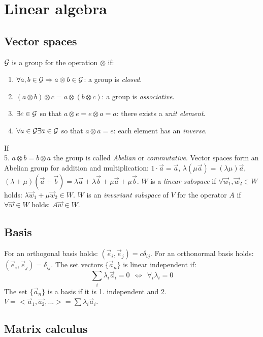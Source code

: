 \documentclass[a4paper,fancyheadings,twoside]{report}
\begin{document}
\chapter{Linear algebra}
\section{Vector spaces}
$\cal G$ is a group for the operation $\otimes$ if:
\begin{enumerate}
\item $\forall a,b\in{\cal G}\Rightarrow a\otimes b\in\cal G$: a group is
      {\it closed}.
\item $(a\otimes b)\otimes c = a\otimes (b\otimes c)$: a group is
      {\it associative}.
\item $\exists e\in{\cal G}$ so that $a\otimes e=e\otimes a=a$: there exists a
      {\it unit element}.
\item $\forall a\in{\cal G}\exists \overline{a}\in{\cal G}$ so that $a\otimes\overline{a}=e$:
      each element has an {\it inverse}.
\end{enumerate}
If\\
\hspace*{4.5mm}5. $a\otimes b=b\otimes a$
\npar
the group is called {\it Abelian} or {\it commutative}.
Vector spaces form an Abelian group for addition and multiplication:
$1\cdot\vec{a}=\vec{a}$, $\lambda(\mu\vec{a})=(\lambda\mu)\vec{a}$,
$(\lambda+\mu)(\vec{a}+\vec{b})=\lambda\vec{a}+\lambda\vec{b}+\mu\vec{a}+\mu\vec{b}$.
\npar
$W$ is a {\it linear subspace} if $\forall \vec{w}_1,\vec{w}_2\in W$
holds: $\lambda\vec{w}_1+\mu\vec{w}_2\in W$.
\npar
$W$ is an {\it invariant subspace} of $V$ for the operator $A$ if
$\forall\vec{w}\in W$ holds: $A\vec{w}\in W$.

\section{Basis}
For an orthogonal basis holds: $(\vec{e}_i,\vec{e}_j)=c\delta_{ij}$. For an
orthonormal basis holds:  $(\vec{e}_i,\vec{e}_j)=\delta_{ij}$.
\npar
The set vectors $\{\vec{a}_n\}$ is linear independent if:
\[
\sum\limits_i\lambda_i\vec{a}_i=0~~\Leftrightarrow~~\forall_i\lambda_i=0
\]
The set $\{\vec{a}_n\}$ is a basis if it is 1. independent and 2.
$V=<\vec{a}_1,\vec{a_2},...>=\sum\lambda_i\vec{a}_i$.

\section{Matrix calculus}
\end{document}
